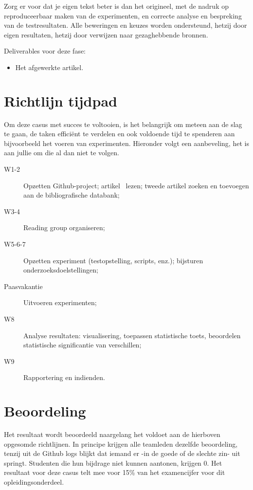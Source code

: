 \documentclass[fleqn,10pt]{voorstel}
\begin{document}
Zorg er voor dat je eigen tekst beter is dan het origineel, met de nadruk op reproduceerbaar maken van de experimenten, en correcte analyse en bespreking van de testresultaten. Alle beweringen en keuzes worden ondersteund, hetzij door eigen resultaten, hetzij door verwijzen naar gezaghebbende bronnen.

Deliverables voor deze fase:

\begin{itemize}
	\item Het afgewerkte artikel.
\end{itemize}

\section{Richtlijn tijdpad}

Om deze casus met succes te voltooien, is het belangrijk om meteen aan de slag te gaan, de taken efficiënt te verdelen en ook voldoende tijd te spenderen aan bijvoorbeeld het voeren van experimenten. Hieronder volgt een aanbeveling, het is aan jullie om die al dan niet te volgen.

\begin{description}
	\item[W1-2] Opzetten Github-project; artikel~\textcite{Bassil2012} lezen; tweede artikel zoeken en toevoegen aan de bibliografische databank;
	\item[W3-4] Reading group organiseren;
	\item[W5-6-7] Opzetten experiment (testopstelling, scripts, enz.); bijsturen onderzoeksdoelstellingen;
	\item[Paasvakantie] Uitvoeren experimenten;
	\item[W8] Analyse resultaten: visualisering, toepassen statistische toets, beoordelen statistische significantie van verschillen;
	\item[W9] Rapportering en indienden.
\end{description}

\section{Beoordeling}

Het resultaat wordt beoordeeld naargelang het voldoet aan de hierboven opgesomde richtlijnen. In principe krijgen alle teamleden dezelfde beoordeling, tenzij uit de Github logs blijkt dat iemand er -in de goede of de slechte zin- uit springt. Studenten die hun bijdrage niet kunnen aantonen, krijgen 0. Het resultaat voor deze casus telt mee voor 15\% van het examencijfer voor dit opleidingsonderdeel.


\printbibliography[heading=bibintoc]
\end{document}
